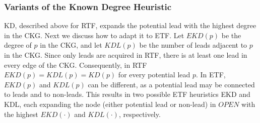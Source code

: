 \documentclass[prodmode,acmtecs]{acmsmall} %
\newcommand{\islead}[1]{{\em IsLead(#1)}}
\begin{document}




\subsubsection{Variants of the Known Degree Heuristic}
KD, described above for RTF, expands the potential lead with the highest degree
in the CKG.
Next we discuss how to adapt it to ETF. Let $EKD(p)$ be the degree of $p$ in the
CKG, and let $KDL(p)$  be the number of leads adjacent to $p$ in the CKG.
Since only leads are acquired in RTF, there is at least one lead in every edge
of the CKG. Consequently, in RTF $EKD(p)=KDL(p)=KD(p)$ for every potential lead $p$.
In ETF, $EKD(p)$ and $KDL(p)$ can be different, as a potential lead may be connected to leads and to non-leads. This results in two possible ETF heuristics EKD and KDL, each expanding the node (either potential lead or
non-lead) in $OPEN$ with the highest $EKD(\cdot)$ and $KDL(\cdot)$, respectively.
\end{document}
